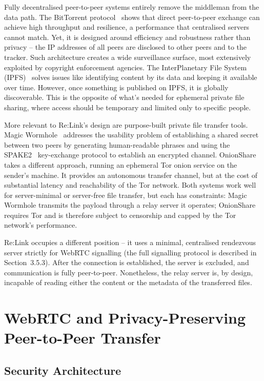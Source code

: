 \documentclass[12pt,a4paper,oneside]{report}
\begin{document}
Fully decentralised peer-to-peer systems entirely remove the middleman from the data path. The BitTorrent protocol~\cite{bittorrent} shows that direct peer-to-peer exchange can achieve high throughput and resilience, a performance that centralised servers cannot match. Yet, it is designed around efficiency and robustness rather than privacy -- the IP addresses of all peers are disclosed to other peers and to the tracker. Such architecture creates a wide surveillance surface, most extensively exploited by copyright enforcement agencies. The InterPlanetary File System (IPFS)~\cite{benet2014} solves issues like identifying content by its data and keeping it available over time. However, once something is published on IPFS, it is globally discoverable. This is the opposite of what's needed for ephemeral private file sharing, where access should be temporary and limited only to specific people.

More relevant to Re:Link's design are purpose-built private file transfer tools. Magic Wormhole~\cite{magicwormhole} addresses the usability problem of establishing a shared secret between two peers by generating human-readable phrases and using the SPAKE2~\cite{rfc9382} key-exchange protocol to establish an encrypted channel. OnionShare~\cite{onionshare} takes a different approach, running an ephemeral Tor onion service on the sender's machine. It provides an autonomous transfer channel, but at the cost of substantial latency and reachability of the Tor network. Both systems work well for server-minimal or server-free file transfer, but each has constraints: Magic Wormhole transmits the payload through a relay server it operates; OnionShare requires Tor and is therefore subject to censorship and capped by the Tor network's performance.

Re:Link occupies a different position -- it uses a minimal, centralised rendezvous server strictly for WebRTC signalling (the full signalling protocol is described in Section~3.5.3). After the connection is established, the server is excluded, and communication is fully peer-to-peer. Nonetheless, the relay server is, by design, incapable of reading either the content or the metadata of the transferred files.


\section{WebRTC and Privacy-Preserving Peer-to-Peer Transfer}
\label{sec:webrtc-privacy}

\subsection{Security Architecture}
\label{sec:webrtc-security}
\end{document}
